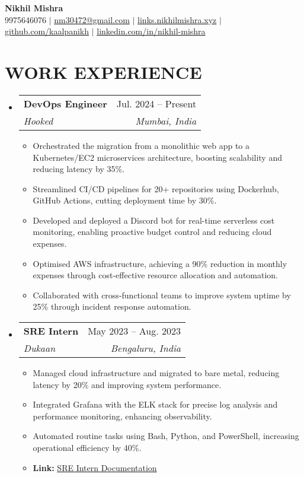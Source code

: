 \documentclass[letterpaper,11pt]{article}
\makeatletter
\newcommand{\resumeItem}[1]{%
  \item\small{#1\vspace{-2pt}}%
}
\newcommand{\resumeSubheading}[4]{%
  \vspace{-2pt}\item%
  \begin{tabular*}{0.97\textwidth}[t]{l@{\extracolsep{\fill}}r}%
    \textbf{#1} & #2 \\
    \textit{\small #3} & \textit{\small #4} \\
  \end{tabular*}\vspace{-7pt}%
}
\newcommand{\resumeSubHeadingListStart}{\begin{itemize}[leftmargin=0.15in, label={}]}
\newcommand{\resumeSubHeadingListEnd}{\end{itemize}}
\newcommand{\resumeItemListStart}{\begin{itemize}}
\newcommand{\resumeItemListEnd}{\end{itemize}\vspace{-5pt}}
\makeatother
\begin{document}
\begin{center}
  \textbf{\Huge Nikhil Mishra} \\
  \vspace{1pt}
  \small 9975646076 $|$ \href{mailto:nm30472@gmail.com}{nm30472@gmail.com} $|$
  \href{https://links.nikhilmishra.xyz}{links.nikhilmishra.xyz} $|$
  \href{https://github.com/kaalpanikh}{github.com/kaalpanikh} $|$
  \href{https://www.linkedin.com/in/nikhil-mishra-392503306/}{linkedin.com/in/nikhil-mishra}
\end{center}

\section{WORK EXPERIENCE}
  \resumeSubHeadingListStart
    \resumeSubheading
      {DevOps Engineer}{Jul. 2024 -- Present}
      {Hooked}{Mumbai, India}
      \resumeItemListStart
        \resumeItem{Orchestrated the migration from a monolithic web app to a Kubernetes/EC2 microservices architecture, boosting scalability and reducing latency by 35\%.}
        \resumeItem{Streamlined CI/CD pipelines for 20+ repositories using Dockerhub, GitHub Actions, cutting deployment time by 30\%.}
        \resumeItem{Developed and deployed a Discord bot for real-time serverless cost monitoring, enabling proactive budget control and reducing cloud expenses.}
        \resumeItem{Optimised AWS infrastructure, achieving a 90\% reduction in monthly expenses through cost-effective resource allocation and automation.}
        \resumeItem{Collaborated with cross-functional teams to improve system uptime by 25\% through incident response automation.}
      \resumeItemListEnd
    
    \resumeSubheading
      {SRE Intern}{May 2023 -- Aug. 2023}
      {Dukaan}{Bengaluru, India}
      \resumeItemListStart
        \resumeItem{Managed cloud infrastructure and migrated to bare metal, reducing latency by 20\% and improving system performance.}
        \resumeItem{Integrated Grafana with the ELK stack for precise log analysis and performance monitoring, enhancing observability.}
        \resumeItem{Automated routine tasks using Bash, Python, and PowerShell, increasing operational efficiency by 40\%.}
        \resumeItem{\textbf{Link:} \href{https://nikhilmishra.notion.site/SRE-INTERN-AT-DUKAAN-2d242bb787194466bfe3577b80735100?source=copy_link}{SRE Intern Documentation}}
      \resumeItemListEnd
  \resumeSubHeadingListEnd
\end{document}
